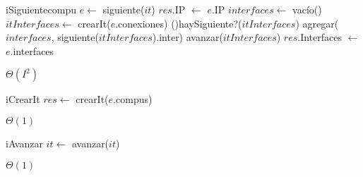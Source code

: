 \begin{Algoritmos}
  \begin{algoritmo}{iSiguiente}{}{compu}{}
     $e \gets$ siguiente($it$)
    $res$.IP $\gets$ $e$.IP
     $interfaces \gets$ vac\'{i}o()
     $itInterfaces \gets$ crearIt($e$.conexiones)
    \While(){haySiguiente?($itInterfaces$)}{
      agregar($interfaces$, siguiente($itInterfaces$).inter)
      avanzar($itInterfaces$)
    }
    $res$.Interfaces $\gets$ $e$.interfaces
  \end{algoritmo}
    \datosAlgoritmo{} %
  {} %
  {} %
  {$\Theta(I^{2})$} %
  {} %
    
  \begin{algoritmo}{iCrearIt}{}{}
  $res \gets$ crearIt($e$.compus)
  \end{algoritmo}
      \datosAlgoritmo{} %
  {} %
  {} %
  {$\Theta(1)$} %
  {} %
   
  \begin{algoritmo}{iAvanzar}{}{}
  $it \gets$ avanzar($it$)
  \end{algoritmo}
  \datosAlgoritmo{} %
  {} %
  {} %
  {$\Theta(1)$} %
  {} %

\end{Algoritmos}
